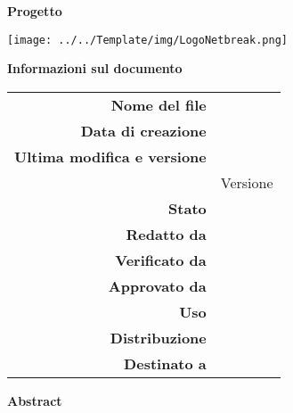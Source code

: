 
\begin{center}



\vspace{4em}

\begin{center} 
	\begin{Huge}
		\textbf{\fontsize{15mm}{20mm}\selectfont \gruppoLink} 
	\end{Huge}
\end{center}

\begin{center}
	\begin{Large}
		\vspace{0.3em}
		\textbf{Progetto \progetto}
	\end{Large}
\end{center}

\texttt{[image: ../../Template/img/LogoNetbreak.png]}

\thispagestyle{empty}

\vfill

\begin{Huge} \textbf{\documento} \end{Huge}

\begin{center}
\large\textbf{Informazioni sul documento} \\ \vspace{2em}
\small
\begin{tabular}{r l}
	\textbf{Nome del file} & \nomedocumentofisico \\
	\textbf{Data di creazione} & \datacreazione\\
	\textbf{Ultima modifica e versione} & \datamodifica\\ & Versione \versione\\
	\textbf{Stato} & \stato \\
	\textbf{Redatto da}	& \redazione\\
	\textbf{Verificato da}	& \verifica\\
	\textbf{Approvato da}	& \approvazione\\
	\textbf{Uso}  & \uso\\
	\textbf{Distribuzione} & \gruppo \\
	\textbf{Destinato a}  &  \destinateTo \\
\end{tabular}
\end{center}

\vspace{2em}

\normalsize
\textbf{Abstract\\} 

\end{center}
\clearpage
